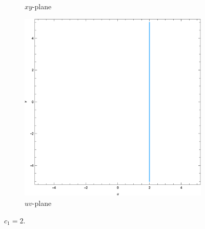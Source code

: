 \documentclass[12pt]{book}
\begin{document}
\begin{enumerate}
\begin{enumerate}[label = {(\roman*)}]
\begin{figure}[H]
\begin{subfigure}{0.45\textwidth}
                    \caption{$xy$-plane}
                \end{subfigure}
                \qquad
                \begin{subfigure}{0.45\textwidth}
                    \centering
                    \includegraphics[width = \textwidth]{./figs/chapter_1/f_map_2_2.eps}
                    \caption{$uv$-plane}
                \end{subfigure}
                \caption{$c_1 = 2.$}
            \end{figure}
    \end{enumerate}
    

\end{enumerate}
\end{document}

